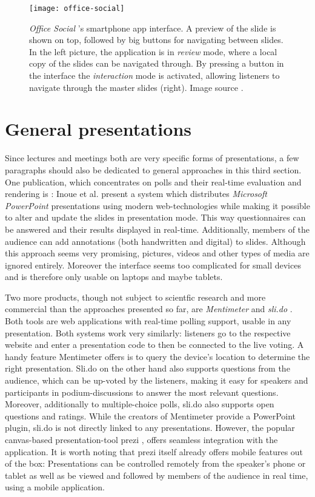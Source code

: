 \begin{figure}
\centering
\texttt{[image: office-social]}
\caption{\emph{Office Social} \cite{Chattopadhyay:OfficeSocialRemoteControl}'s smartphone app interface. A preview of the slide is shown on top, followed by big buttons for navigating between slides. In the left picture, the application is in \emph{review} mode, where a local copy of the slides can be navigated through. By pressing a button in the interface the \emph{interaction} mode is activated, allowing listeners to navigate through the master slides (right). Image source \cite{Chattopadhyay:OfficeSocialRemoteControl}.}
\label{fig:related-work-crowd-feedback}
\end{figure}

\section{General presentations}
\label{sec:related-work-general}
Since lectures and meetings both are very specific forms of presentations, a few paragraphs should also be dedicated to general approaches in this third section.
One publication, which concentrates on polls and their real-time evaluation and rendering is \cite{Inoue:RealTimeQuestionnaire}: Inoue et al. present a system which distributes \emph{Microsoft PowerPoint} presentations using modern web-technologies while making it possible to alter and update the slides in presentation mode. This way questionnaires can be answered and their results displayed in real-time. Additionally, members of the audience can add annotations (both handwritten and digital) to slides. Although this approach seems very promising, pictures, videos and other types of media are ignored entirely. Moreover the interface seems too complicated for small devices and is therefore only usable on laptops and maybe tablets.

Two more products, though not subject to scientfic research and more commercial than the approaches presented so far, are \emph{Mentimeter} \cite{mentimeter} and \emph{sli.do} \cite{slido}. Both tools are web applications with real-time polling support, usable in any presentation. Both systems work very similarly: listeners go to the respective website and enter a presentation code to then be connected to the live voting. A handy feature Mentimeter offers is to query the device's location to determine the right presentation. Sli.do on the other hand also supports questions from the audience, which can be up-voted by the listeners, making it easy for speakers and participants in podium-discussions to answer the most relevant questions. Moreover, additionally to multiple-choice polls, sli.do also supports open questions and ratings. While the creators of Mentimeter provide a PowerPoint plugin, sli.do is not directly linked to any presentations. However, the popular canvas-based presentation-tool prezi \cite{prezi}, offers seamless integration with the application. It is worth noting that prezi itself already offers mobile features out of the box: Presentations can be controlled remotely from the speaker's phone or tablet as well as be viewed and followed by members of the audience in real time, using a mobile application.


